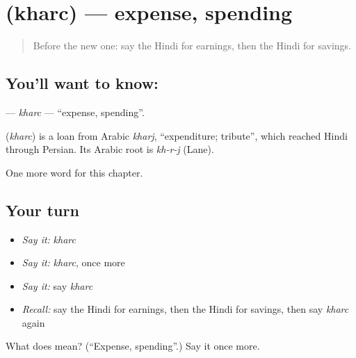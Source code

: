 \section[\texorpdfstring{\hi{ख़र्च} (kharc)}{ख़र्च (kharc)}]{ (kharc) — expense, spending}

\label{lesson:HI-C207-kharc}



\begin{quote}
Before the new one: say the Hindi for earnings, then the Hindi for savings.
\end{quote}

\subsection*{You'll want to know: }
\textbf{} — \emph{kharc} — \textquotedblleft{}expense, spending\textquotedblright{}.

\begin{cousinweb}
\textbf{} (\emph{kharc}) is a loan from Arabic \emph{kharj}, \textquotedblleft{}expenditure; tribute\textquotedblright{}, which reached Hindi through Persian. Its Arabic root is \emph{kh-r-j} (Lane).
\end{cousinweb}

\begin{grammarlens}[title={What you've built}]
One more word for this chapter.
\end{grammarlens}

\subsection*{Your turn}
\begin{itemize}
\raggedright
  \item \emph{Say it:} \emph{kharc}
  \item \emph{Say it:} \emph{kharc}, once more
  \item \emph{Say it:} say \emph{kharc}
  \item \emph{Recall:} say the Hindi for earnings, then the Hindi for savings, then say \emph{kharc} again
\end{itemize}

\begin{tcolorbox}[breakable,colback=teal!4,colframe=teal!35!black,title={Before you move on}]
What does  mean? (\textquotedblleft{}Expense, spending\textquotedblright{}.) Say it once more.
\end{tcolorbox}
